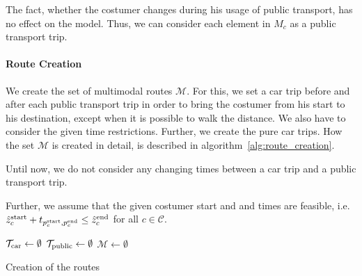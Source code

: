 The fact, whether the costumer changes during his usage of public transport, has no effect on the model. Thus, we can consider each element in $M_c$ as a public transport trip.

\paragraph{Route Creation} \parfill

We create the set of multimodal routes $\mathcal{M}$. For this, we set a car trip before and after each public transport trip in order to bring the costumer from his start to his destination, except when it is possible to walk the distance. We also have to consider the given time restrictions. Further, we create the pure car trips. How the set $\mathcal{M}$ is created in detail, is described in algorithm~\ref{alg:route_creation}.

Until now, we do not consider any changing times between a car trip and a public transport trip.

Further, we assume that the given costumer start and and times are feasible, i.e. $\hat{z}^{\operatorname{start}}_c+t_{p^{\operatorname{start}}_c,p^{\operatorname{end}}_c}\leq\hat{z}^{\operatorname{end}}_c$ for all $c\in\mathcal{C}$.

\begin{algorithm}
	\SetAlgoLined
	$\mathcal{T}_{\operatorname{car}}\gets\emptyset$\;
	$\mathcal{T}_{\operatorname{public}}\gets\emptyset$\;
	$\mathcal{M}\gets\emptyset$\;
	\caption{Creation of the routes \label{alg:route_creation}}
\end{algorithm}

